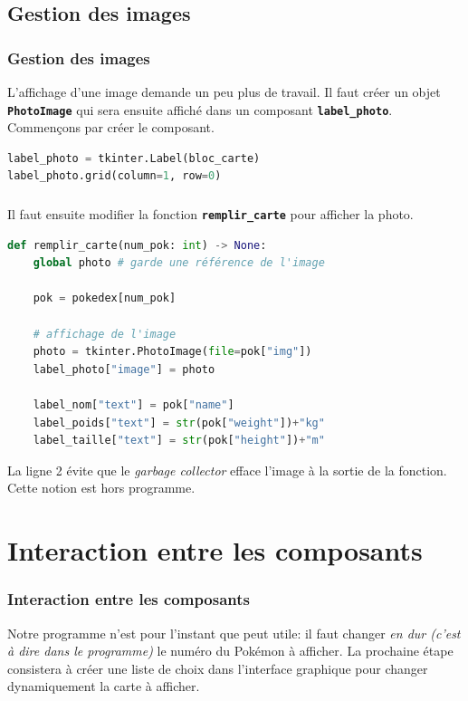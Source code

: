 \documentclass[svgnames,11pt]{beamer}
\begin{document}
\subsection{Gestion des images}
\begin{frame}[fragile]
    \frametitle{Gestion des images}

    L'affichage d'une image demande un peu plus de travail. Il faut créer un objet \textbf{\texttt{PhotoImage}} qui sera ensuite affiché dans un composant \textbf{\texttt{label\_photo}}. Commençons par créer le composant.
    \begin{center}
        \begin{lstlisting}[language=Python, basicstyle=\small]
label_photo = tkinter.Label(bloc_carte)
label_photo.grid(column=1, row=0)  
\end{lstlisting}
        \label{CODE}
    \end{center}

\end{frame}

\begin{frame}[fragile]
    \frametitle{}

    Il faut ensuite modifier la fonction \textbf{\texttt{remplir\_carte}} pour afficher la photo.

    \begin{center}
        \begin{lstlisting}[language=Python, basicstyle=\small]
def remplir_carte(num_pok: int) -> None:
    global photo # garde une référence de l'image

    pok = pokedex[num_pok]

    # affichage de l'image
    photo = tkinter.PhotoImage(file=pok["img"])
    label_photo["image"] = photo

    label_nom["text"] = pok["name"]
    label_poids["text"] = str(pok["weight"])+"kg"
    label_taille["text"] = str(pok["height"])+"m"
\end{lstlisting}
    \end{center}
    \begin{aretenir}[Commentaire]
        La ligne 2 évite que le \emph{garbage collector} efface l'image à la sortie de la fonction. Cette notion est hors programme.
    \end{aretenir}
\end{frame}
\section{Interaction entre les composants}
\begin{frame}
    \frametitle{Interaction entre les composants}

    Notre programme n'est pour l'instant que peut utile: il faut changer \emph{en dur (c'est à dire dans le programme)} le numéro du Pokémon à afficher. La prochaine étape consistera à créer une liste de choix dans l'interface graphique pour changer dynamiquement la carte à afficher.


\end{frame}
\end{document}
